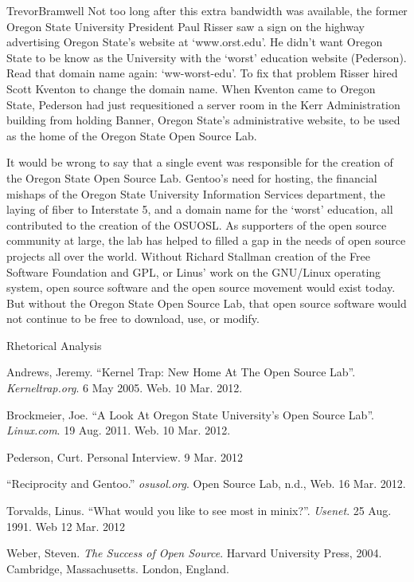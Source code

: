 \documentclass[12pt,letterpaper]{article}
\begin{document}
\begin{mla}{Trevor}{Bramwell}
Not too long after this extra bandwidth was available, the former Oregon State
University President Paul Risser saw a sign on the highway advertising Oregon
State's website at `www.orst.edu'. He didn't want Oregon State to be know as
the University with the `worst' education website (Pederson).
Read that domain name again: `ww-worst-edu'. To fix that problem Risser hired
Scott Kventon to change the domain name. When Kventon came to Oregon State,
Pederson had just requesitioned a server room in the Kerr Administration
building from holding Banner, Oregon State's administrative website, to be used
as the home of the Oregon State Open Source Lab.

It would be wrong to say that a single event was responsible for the creation
of the Oregon State Open Source Lab. Gentoo's need for hosting, the financial
mishaps of the Oregon State University Information Services department, the
laying of fiber to Interstate 5, and a domain name for the `worst' education,
all contributed to the creation of the OSUOSL. As supporters of the open source
community at large, the lab has helped to filled a gap in the needs of open
source projects all over the world. 
Without Richard Stallman creation of the Free Software Foundation and GPL,
or Linus' work on the GNU/Linux operating system, open source software
and the open source movement would exist today.  
But without the Oregon State Open Source Lab, that open source software 
would not continue to be free to download, use, or modify.

%
\pagebreak
{\centering Rhetorical Analysis\\}

\begin{workscited}
\bibent
Andrews, Jeremy. ``Kernel Trap: New Home At The Open Source Lab''.
    \emph{Kerneltrap.org}. 6 May 2005. Web. 10 Mar. 2012.

\bibent
Brockmeier, Joe. ``A Look At Oregon State University's Open Source Lab''.
    \emph{Linux.com}. 19 Aug. 2011. Web. 10 Mar. 2012.

\bibent
Pederson, Curt. Personal Interview. 9 Mar. 2012

\bibent
``Reciprocity and Gentoo.'' \emph{osusol.org}. Open Source Lab, n.d., Web.
    16 Mar. 2012.

\bibent
Torvalds, Linus. ``What would you like to see most in minix?''. \emph{Usenet}.
    25 Aug. 1991. Web 12 Mar. 2012

\bibent
Weber, Steven. \emph{The Success of Open Source}. Harvard University Press, 
    2004. 
Cambridge, Massachusetts.
London, England.
\end{workscited}

\end{mla}
\end{document}

